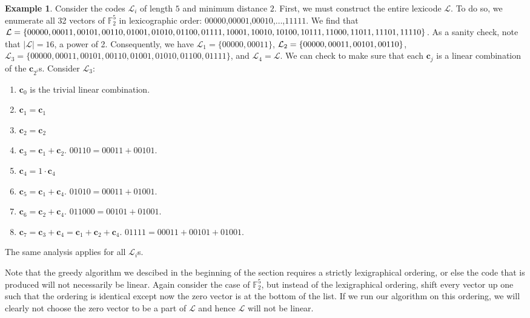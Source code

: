 \documentclass{article}
\numberwithin{theorem}{subsection}
\theoremstyle{definition}
\newtheorem{exmp}{Example}
\numberwithin{exmp}{subsection}
\theoremstyle{definition}
\numberwithin{defn}{subsection}
\theoremstyle{definition}
\numberwithin{claim}{subsection}
\begin{document}
\begin{exmp}
Consider the codes $\mathcal{L}_i$ of length $5$ and minimum distance $2$.  First, we must construct the entire lexicode $\mathcal{L}$.  To do so, we enumerate
all 32 vectors of $\mathbb{F}_2^5$ in lexicographic order: $00000$,$00001$,$00010$,$\ldots$,$11111$.  We find that $\mathcal{L} = \{00000, 00011,00101,00110,01001,
01010,01100,01111,10001,10010,\\ 10100,10111,11000,11011,11101,11110\}$.  As a sanity check, note that $\left | \mathcal{L} \right | = 16$, a power of 2.  Consequently, we have
$\mathcal{L}_1 = \{00000,00011\}$, $\mathcal{L}_2 = \{00000, 00011,00101,\\ 00110\}$, $\mathcal{L}_3 = \{00000, 00011,00101,00110,01001,01010,01100,01111\}$, and
$\mathcal{L}_4 = \mathcal{L}$. We can check to make sure that each $\mathbf{c}_j$ is a linear combination of the $\mathbf{c}_{2^i}$s. Consider $\mathcal{L}_3$:  

\begin{enumerate}[start=0]
\item $\mathbf{c}_0$ is the trivial linear combination.
\item $\mathbf{c}_1 = \mathbf{c}_1$
\item $\mathbf{c}_2 = \mathbf{c}_2$
\item $\mathbf{c}_3 = \mathbf{c}_1 + \mathbf{c}_2$.  $00110 = 00011+ 00101$.
\item $\mathbf{c}_4 = 1\cdot\mathbf{c}_4$
\item $\mathbf{c}_5 = \mathbf{c}_1 + \mathbf{c}_4$. $01010 = 00011 + 01001$.
\item $\mathbf{c}_6 = \mathbf{c}_2 + \mathbf{c}_4$. $011000 = 00101 + 01001$.
\item $\mathbf{c}_7 = \mathbf{c}_3 + \mathbf{c}_4 = \mathbf{c}_1 + \mathbf{c}_2 + \mathbf{c}_4$. $01111 = 00011 + 00101+01001$.
\end{enumerate}

The same analysis applies for all $\mathcal{L}_i$s.

\end{exmp}

Note that the greedy algorithm we descibed in the beginning of the section requires a strictly lexigraphical ordering, or else the code that is produced will not necessarily
be linear.  Again consider the case of $\mathbb{F}_2^5$, but instead of the lexigraphical ordering, shift every vector up one such that the ordering is identical except now the
zero vector is at the bottom of the list.  If we run our algorithm on this ordering, we will clearly not choose the zero vector to be a part of $\mathcal{L}$ and hence 
$\mathcal{L}$ will not be linear.  
\end{document}
